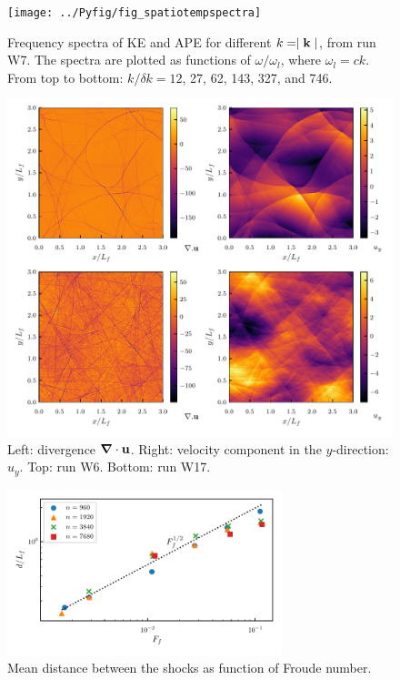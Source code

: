 \documentclass{jfm}
\providecommand\bnabla{\boldsymbol{\nabla}}
\begin{document}
\begin{figure}
\centerline{\texttt{[image: ../Pyfig/fig\_spatiotempspectra]}}
\caption{Frequency spectra of KE and APE for different $ k = \mid {\bf k} \mid
$, from run W7. The spectra are plotted as functions of $\omega/\omega_l$,
where $\omega_l = c k$. From top to bottom: $ k /\delta k = 12$, 27, 62, 143,
327, and 746. }
\label{fig_spatiotemp_spectra}
\end{figure}

\begin{figure}
\centerline{\includegraphics[width=6.0in]{../Pyfig/fig_phys_fields_wave}}
\caption{Left: divergence $ \bnabla \cdot {\bf u} $. Right: velocity component in the $ y $-direction: $ u_y $. Top: run W6. Bottom: run W17.  }
\label{Physical}
\end{figure}

\begin{figure}
\centerline{\includegraphics[width=8cm]{../Pyfig/fig_shock_sep.pdf}}
\caption{Mean distance between the shocks as function of Froude number.  }
\label{fig_distance}
\end{figure}
\end{document}
